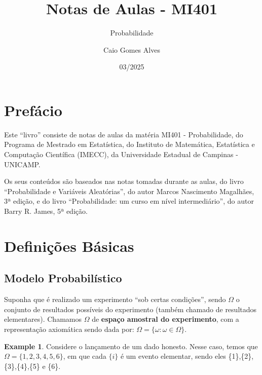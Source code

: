 \documentclass[
]{article}
\title{Notas de Aulas - MI401}
\subtitle{Probabilidade}
\author{Caio Gomes Alves}
\date{03/2025}
\theoremstyle{definition}
\theoremstyle{definition}
\newtheorem{example}{Example}[section]
\theoremstyle{definition}
\theoremstyle{definition}
\theoremstyle{remark}
\begin{document}
\maketitle

\renewcommand*\contentsname{Conteúdos}
{
\setcounter{tocdepth}{2}
\tableofcontents
}
\newpage

\hypertarget{prefuxe1cio}{%
\section{Prefácio}\label{prefuxe1cio}}

Este ``livro'' consiste de notas de aulas da matéria MI401 - Probabilidade, do Programa de Mestrado em Estatística, do Instituto de Matemática, Estatística e Computação Científica (IMECC), da Universidade Estadual de Campinas - UNICAMP.

Os seus conteúdos são baseados nas notas tomadas durante as aulas, do livro ``Probabilidade e Variáveis Aleatórias'', do autor Marcos Nascimento Magalhães, 3ª edição, e do livro ``Probabilidade: um curso em nível intermediário'', do autor Barry R. James, 5ª edição.

\newpage

\hypertarget{definiuxe7uxf5es-buxe1sicas}{%
\section{Definições Básicas}\label{definiuxe7uxf5es-buxe1sicas}}

\hypertarget{modelo-probabiluxedstico}{%
\subsection{Modelo Probabilístico}\label{modelo-probabiluxedstico}}

Suponha que é realizado um experimento ``sob certas condições'', sendo \textbf{\(\Omega\)} o conjunto de resultados possíveis do experimento (também chamado de resultados elementares). Chamamos \textbf{\(\Omega\)} de \textbf{espaço amostral do experimento}, com a representação axiomática sendo dada por: \(\Omega = \{\omega : \omega \in \Omega\}\).

\begin{example}
Considere o lançamento de um dado honesto. Nesse caso, temos que \(\Omega = \{1,2,3,4,5,6\}\), em que cada \(\{i\}\) é um evento elementar, sendo eles \{1\},\{2\},\{3\},\{4\},\{5\} e \{6\}.
\end{example}
\end{document}
